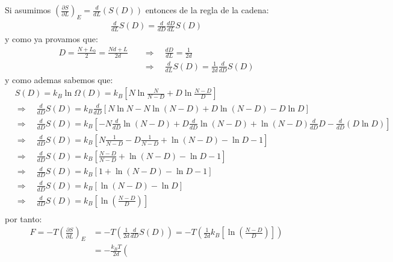 \begin{answer}
    Si asumimos $\left(\frac{\partial S}{\partial L}\right)_E = \frac{d}{dL}(S(D))$ entonces de la regla de la cadena:
    \begin{align*}
        \frac{d}{dL}S(D) = \frac{d}{dD}\frac{dD}{dL}S(D)
    \end{align*}
    y como ya provamos que:
    \begin{align*}
        D = \frac{N + L_0}{2} = \frac{Nd + L}{2d} \quad &\Rightarrow \quad \frac{dD}{dL} = \frac{1}{2d}\\
        &\Rightarrow \quad \frac{d}{dL}S(D) = \frac{1}{2d}\frac{d}{dD}S(D)
    \end{align*}
    y como ademas sabemos que:
    \begin{align*}
        &S(D) = k_B \ln \Omega(D) = k_B \left[
            N \ln \frac{N}{N-D} + D \ln \frac{N-D}{D}
        \right] \quad\\
        &\Rightarrow \quad \frac{d}{dD}S(D) = k_B \frac{d}{dD}\left[
            N \ln N - N \ln ({N-D}) + D \ln ({N-D}) - D\ln D
        \right]\\
        &\Rightarrow \quad \frac{d}{dD}S(D) = k_B \left[
            -N \frac{d}{dD}\ln ({N-D}) + D \frac{d}{dD}\ln ({N-D}) + \ln ({N-D})\frac{d}{dD}D  - \frac{d}{dD}\left(D\ln D\right)
        \right]\\
        &\Rightarrow \quad \frac{d}{dD}S(D) = k_B \left[
            N \frac{1}{N-D} - D \frac{1}{N-D} + \ln(N-D) - \ln D - 1
        \right]\\
        &\Rightarrow \quad \frac{d}{dD}S(D) = k_B \left[
            \frac{N-D}{N-D} + \ln(N-D) - \ln D - 1
        \right]\\
        &\Rightarrow \quad \frac{d}{dD}S(D) = k_B \left[
            1 + \ln(N-D) - \ln D - 1
        \right]\\
        &\Rightarrow \quad \frac{d}{dD}S(D) = k_B \left[
            \ln(N-D) - \ln D
        \right]\\
        &\Rightarrow \quad \frac{d}{dD}S(D) = k_B \left[
            \ln\left(\frac{N-D}{D}\right)
        \right]\\
    \end{align*}
    por tanto:
    \begin{align*}
        F = -T \left(
            \frac{\partial S}{\partial L}
        \right)_E &= -T \left(
            \frac{1}{2d}\frac{d}{dD}S(D)
        \right) = -T \left(
            \frac{1}{2d}k_B \left[
                \ln\left(\frac{N-D}{D}\right)
            \right]
        \right)\\ &= -\frac{k_B T}{2d} \left(

\end{align*}
\end{answer}
